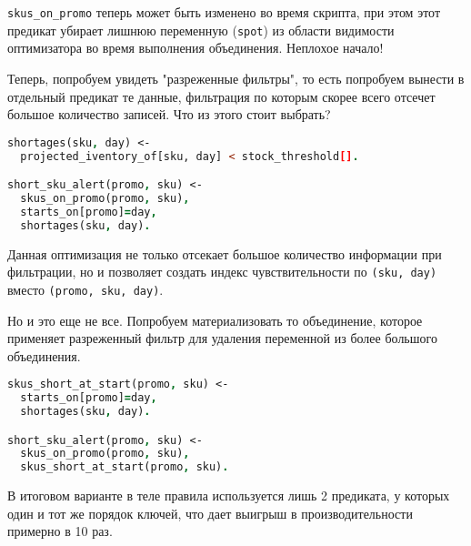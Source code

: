 \lstinline{skus_on_promo} теперь может быть изменено во время скрипта, при этом этот предикат убирает лишнюю переменную (\lstinline{spot}) из области видимости оптимизатора во время выполнения объединения. Неплохое начало!

Теперь, попробуем увидеть "разреженные фильтры", то есть попробуем вынести в отдельный предикат те данные, фильтрация по которым скорее всего отсечет большое количество записей. Что из этого стоит выбрать?

\begin{lstlisting}[language=Prolog]
shortages(sku, day) <-
  projected_iventory_of[sku, day] < stock_threshold[].

short_sku_alert(promo, sku) <-
  skus_on_promo(promo, sku),
  starts_on[promo]=day,
  shortages(sku, day).
\end{lstlisting}

Данная оптимизация не только отсекает большое количество информации при фильтрации, но и позволяет создать индекс чувствительности по \lstinline{(sku, day)} вместо \lstinline{(promo, sku, day)}.

Но и это еще не все. Попробуем материализовать то объединение, которое применяет разреженный фильтр для удаления переменной из более большого объединения.

\begin{lstlisting}[language=Prolog]
skus_short_at_start(promo, sku) <-
  starts_on[promo]=day,
  shortages(sku, day).

short_sku_alert(promo, sku) <-
  skus_on_promo(promo, sku),
  skus_short_at_start(promo, sku).
\end{lstlisting}

В итоговом варианте в теле правила используется лишь 2 предиката, у которых один и тот же порядок ключей, что дает выигрыш в производительности примерно в 10 раз.
